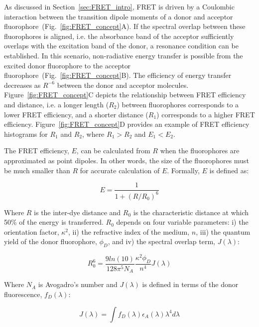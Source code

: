 As discussed in Section~\ref{sec:FRET_intro}, FRET is driven by a Coulombic interaction between the transition dipole moments of a donor and acceptor fluorophore~(Fig.~\ref{fig:FRET_concept}A).
If the spectral overlap between these fluorophores is aligned, i.e. the absorbance band of the acceptor sufficiently overlaps with the excitation band of the donor, a resonance condition can be established. 
In this scenario, non-radiative energy transfer is possible from the excited donor fluorophore to the acceptor fluorophore~(Fig.~\ref{fig:FRET_concept}B). 
The efficiency of energy transfer decreases as $R^{-6}$ between the donor and acceptor molecules. 
Figure~\ref{fig:FRET_concept}C depicts the relationship between FRET efficiency and distance, i.e. a longer length ($R_2$) between fluorophores corresponds to a lower FRET efficiency, and a shorter distance ($R_1$) corresponds to a higher FRET efficiency.
Figure~\ref{fig:FRET_concept}D provides an example of FRET efficiency histograms for $R_1$ and $R_2$, where $R_1 > R_2$ and $E_1 < E_2$.

The FRET efficiency, $E$, can be calculated from $R$ when the fluorophores are approximated as point dipoles.
In other words, the size of the fluorophores must be much smaller than $R$ for accurate calculation of $E$. Formally, $E$ is defined as:

\begin{equation}
\label{eqn:E}
E=\frac{1}{1+(R/R_0)^6}
\end{equation}

\noindent
Where $R$ is the inter-dye distance and $R_0$ is the characteristic distance at which 50\% of the energy is transferred.
$R_0$ depends on four variable parameters: i) the orientation factor, $\kappa^2$, ii) the refractive index of the medium, $n$, iii) the quantum yield of the donor fluorophore, $\phi_D$, and iv) the spectral overlap term, $J(\lambda)$:

\begin{equation}
\label{eqn:R_0^6}
R_0^6 = \frac{9ln(10)}{128\pi^5 N_A} \frac{\kappa^2 \phi_D}{n^4}J(\lambda)
\end{equation}

\noindent
Where $N_A$ is Avogadro's number and $J(\lambda)$ is defined in terms of the donor fluorescence, $f_D(\lambda)$:

\begin{equation}
\label{eqn:J}
J(\lambda) = \int f_D(\lambda)\epsilon_A(\lambda)\lambda^4 d\lambda
\end{equation}

